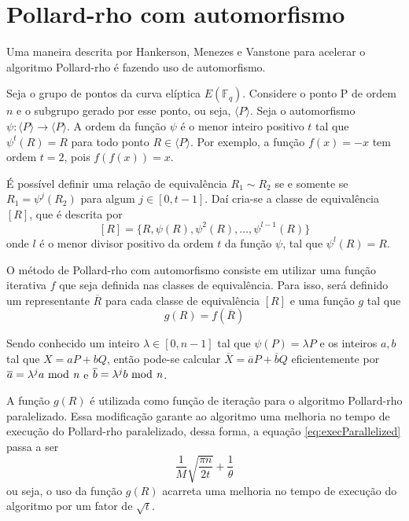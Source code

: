 %
%
\section{Pollard-rho com automorfismo}

Uma maneira descrita por Hankerson, Menezes e Vanstone para acelerar o algoritmo Pollard-rho é fazendo uso de automorfismo.\cite{Guide}

Seja o grupo de pontos da curva elíptica $E(\mathbb{F}_q)$. Considere o ponto P de ordem \(n\) e o subgrupo gerado por esse ponto, ou seja, $\langle P \rangle$. Seja o automorfismo $\psi: \langle P \rangle \to \langle P \rangle$. A ordem da função $\psi$ é o menor inteiro positivo $t$ tal que $\psi^t(R) = R$ para todo ponto $R \in \langle P \rangle$. Por exemplo, a função $f(x) = -x$ tem ordem $t = 2$, pois $f(f(x)) = x$.

É possível definir uma relação de equivalência $R_1 \sim R_2$ se e somente se $R_1 = \psi^j(R_2)$ para algum $j \in [0, t - 1]$. Daí cria-se a classe de equivalência $[R]$, que é descrita por
$$
[R] = \{R, \psi(R), \psi^2(R), \dots, \psi^{l-1}(R)\}
$$
onde $l$ é o menor divisor positivo da ordem $t$ da função $\psi$, tal que $\psi^l(R) = R$.

O método de Pollard-rho com automorfismo consiste em utilizar uma função iterativa $f$ que seja definida nas classes de equivalência. Para isso, será definido um representante $\overline{R}$ para cada classe de equivalência $[R]$ e uma função $g$ tal que
$$
g(R) = f(\overline{R})
$$

Sendo conhecido um inteiro $\lambda \in [0, n - 1]$ tal que $\psi(P) = \lambda P$ e os inteiros $a,b$ tal que $X = aP + bQ$, então pode-se calcular $\overline{X} = \overline{a}P + \overline{b}Q$ eficientemente por $\overline{a} = \lambda^{j}a \mbox{ mod \textit{n}}$ e $\overline{b} = \lambda^{j}b \mbox{ mod \textit{n}}$.

A função $g(R)$ é utilizada como função de iteração para o algoritmo Pollard-rho paralelizado. Essa modificação garante ao algoritmo uma melhoria no tempo de execução do Pollard-rho paralelizado, dessa forma, a equação \ref{eq:execParallelized} passa a ser
$$
\frac{1}{M} \sqrt{ \frac{\pi n}{2t} } + \frac{1}{\theta}
$$
ou seja, o uso da função $g(R)$ acarreta uma melhoria no tempo de execução do algoritmo por um fator de $\sqrt{t}$. \cite{Guide}
